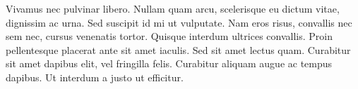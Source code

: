 Vivamus nec pulvinar libero. Nullam quam arcu, scelerisque eu dictum vitae, dignissim ac urna. Sed suscipit id mi ut vulputate. Nam eros risus, convallis nec sem nec, cursus venenatis tortor. Quisque interdum ultrices convallis. Proin pellentesque placerat ante sit amet iaculis. Sed sit amet lectus quam. Curabitur sit amet dapibus elit, vel fringilla felis. Curabitur aliquam augue ac tempus dapibus. Ut interdum a justo ut efficitur.